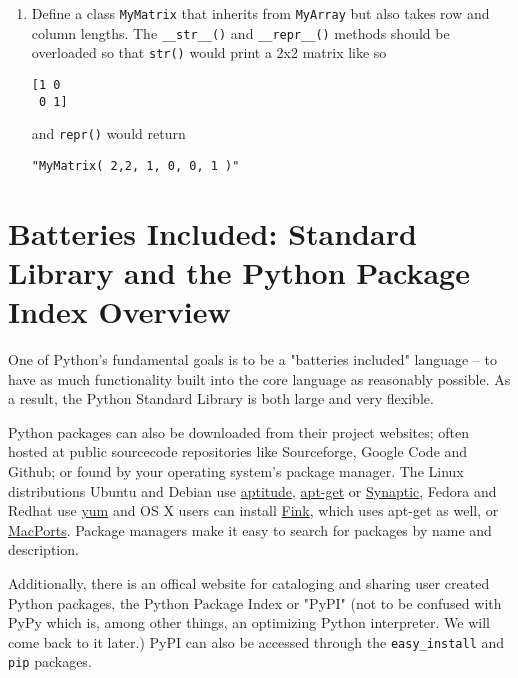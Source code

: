 \documentclass{report}
\begin{document}
\begin{enumerate}
So:
\begin{alltt}
>>>bob = MyArray(1,2,3) + MyArray(3,2,1)
>>>print(bob)
[4,4,4]
\end{alltt}

and \verb|len(MyArray(1,2,3)| returns:
\verb|3|

	\item Define a class \verb|MyMatrix| that inherits from \verb|MyArray| but also takes row and column lengths. The \verb|__str__()| and \verb|__repr__()| methods should be overloaded so that \verb|str()| would print a 2x2 matrix like so

\begin{verbatim}
[1 0
 0 1]
\end{verbatim}

and \verb|repr()| would return

\verb|"MyMatrix( 2,2, 1, 0, 0, 1 )"|

\end{enumerate}

\section{ Batteries Included: Standard Library and the Python Package Index Overview}

One of Python's fundamental goals is to be a "batteries included" language -- to have as much functionality built into the core language as reasonably possible. As a result, the Python Standard Library is both large and very flexible. 

Python packages can also be downloaded from their project websites; often hosted at public sourcecode repositories like Sourceforge, Google Code and Github; or found by your operating system's \gls{package manager}. The Linux distributions Ubuntu and Debian use \href{http://wiki.debian.org/Aptitude?action=show&redirect=aptitude}{aptitude}, \href{http://wiki.debian.org/Apt}{apt-get} or \href{https://help.ubuntu.com/community/SynapticHowto}{Synaptic}, Fedora and Redhat use \href{http://yum.baseurl.org/}{yum} and OS X users can install \href{http://www.finkproject.org/}{Fink}, which uses apt-get as well, or \href{http://www.macports.org/index.php}{MacPorts}. Package managers make it easy to search for packages by name and description.

Additionally, there is an offical website for cataloging and sharing user created Python packages, the Python Package Index or "PyPI" (not to be confused with PyPy which is, among other things, an optimizing Python interpreter. We will come back to it later.) PyPI can also be accessed through the \verb|easy_install| and \verb|pip| packages.
\end{document}
